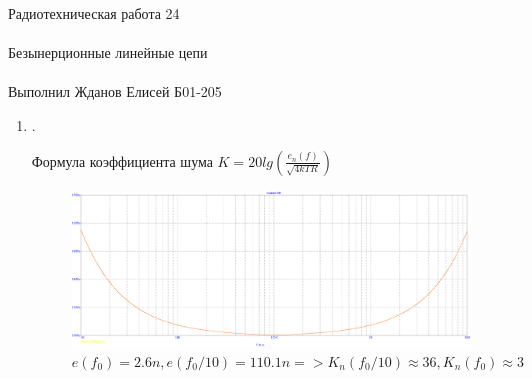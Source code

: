 \documentclass{astroedu-lab}
\begin{document}
\begin{problem}{\huge Радиотехническая работа 24\\\\Безынерционные линейные цепи\\\\Выполнил Жданов Елисей Б01-205}
\begin{enumerate}
\item
.

Формула коэффициента шума $K = 20 lg \left( \frac{e_n(f)}{\sqrt{4 k T R}} \right)$

\begin{figure}[h!]
    \centering
    \includegraphics[scale=0.3]{images/mod4_1_3.png}
    \caption{$e(f_0) = 2.6n, e(f_0/10) = 110.1n => K_n(f_0 / 10) \approx 36, K_n(f_0) \approx 3$}
    \label{fig:m413}
\end{figure}

\end{enumerate}

\end{problem}
\end{document}
